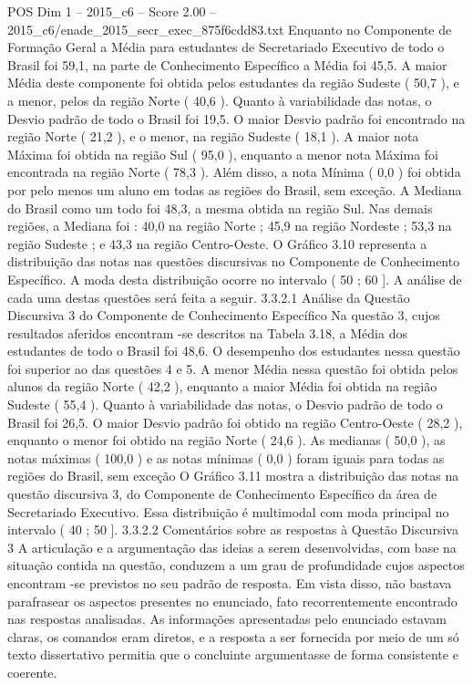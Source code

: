 \begin{textsample}{POS Dim 1 – 2015\_c6 – Score 2.00 – 2015\_c6/enade\_2015\_secr\_exec\_875f6cdd83.txt}
Enquanto no Componente de Formação Geral a Média para estudantes de Secretariado Executivo de todo o Brasil foi 59,1, na parte de Conhecimento Específico a Média foi 45,5.
A maior Média deste componente foi obtida pelos estudantes da região Sudeste ( 50,7 ), e a menor, pelos da região Norte ( 40,6 ).
Quanto à variabilidade das notas, o Desvio padrão de todo o Brasil foi 19,5.
O maior Desvio padrão foi encontrado na região Norte ( 21,2 ), e o menor, na região Sudeste ( 18,1 ).
A maior nota Máxima foi obtida na região Sul ( 95,0 ), enquanto a menor nota Máxima foi encontrada na região Norte ( 78,3 ).
Além disso, a nota Mínima ( 0,0 ) foi obtida por pelo menos um aluno em todas as regiões do Brasil, sem exceção.
A Mediana do Brasil como um todo foi 48,3, a mesma obtida na região Sul.
Nas demais regiões, a Mediana foi : 40,0 na região Norte ; 45,9 na região Nordeste ; 53,3 na região Sudeste ; e 43,3 na região Centro-Oeste.
O Gráfico 3.10 representa a distribuição das notas nas questões discursivas no Componente de Conhecimento Específico.
A moda desta distribuição ocorre no intervalo ( 50 ; 60 ].
A análise de cada uma destas questões será feita a seguir. 3.3.2.1 Análise da Questão Discursiva 3 do Componente de Conhecimento Específico Na questão 3, cujos resultados aferidos encontram -se descritos na Tabela 3.18, a Média dos estudantes de todo o Brasil foi 48,6.
O desempenho dos estudantes nessa questão foi superior ao das questões 4 e 5.
A menor Média nessa questão foi obtida pelos alunos da região Norte ( 42,2 ), enquanto a maior Média foi obtida na região Sudeste ( 55,4 ).
Quanto à variabilidade das notas, o Desvio padrão de todo o Brasil foi 26,5.
O maior Desvio padrão foi obtido na região Centro-Oeste ( 28,2 ), enquanto o menor foi obtido na região Norte ( 24,6 ).
As medianas ( 50,0 ), as notas máximas ( 100,0 ) e as notas mínimas ( 0,0 ) foram iguais para todas as regiões do Brasil, sem exceção O Gráfico 3.11 mostra a distribuição das notas na questão discursiva 3, do Componente de Conhecimento Específico da área de Secretariado Executivo.
Essa distribuição é multimodal com moda principal no intervalo ( 40 ; 50 ]. 3.3.2.2 Comentários sobre as respostas à Questão Discursiva 3 A articulação e a argumentação das ideias a serem desenvolvidas, com base na situação contida na questão, conduzem a um grau de profundidade cujos aspectos encontram -se previstos no seu padrão de resposta.
Em vista disso, não bastava parafrasear os aspectos presentes no enunciado, fato recorrentemente encontrado nas respostas analisadas.
As informações apresentadas pelo enunciado estavam claras, os comandos eram diretos, e a resposta a ser fornecida por meio de um só texto dissertativo permitia que o concluinte argumentasse de forma consistente e coerente.

\end{textsample}

